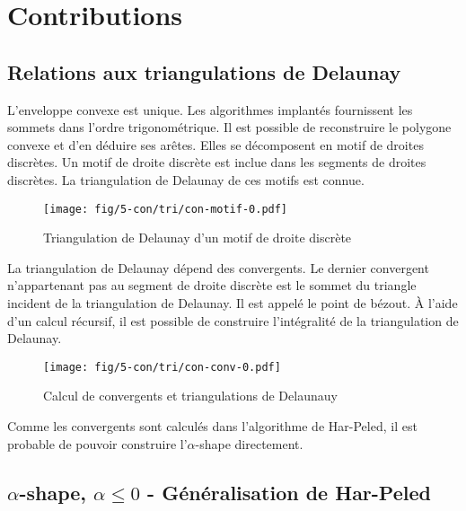 \section{Contributions}

\subsection{Relations aux triangulations de Delaunay}


L'enveloppe convexe est unique. Les algorithmes implantés fournissent les sommets dans l'ordre trigonométrique. Il est possible de reconstruire le polygone convexe et d'en déduire ses arêtes. Elles se décomposent en motif de droites discrètes. Un motif de droite discrète est inclue dans les segments de droites discrètes. La triangulation de Delaunay de ces motifs est connue. \cite{RoussillonL11}\\

\begin{figure}[H]
  \centering
  \texttt{[image: fig/5-con/tri/con-motif-0.pdf]}
  \caption{Triangulation de Delaunay d'un motif de droite discrète}
\end{figure}

La triangulation de Delaunay dépend des convergents. Le dernier convergent n'appartenant pas au segment de droite discrète est le sommet du triangle incident de la triangulation de Delaunay. Il est appelé le point de bézout. À l'aide d'un calcul récursif, il est possible de construire l'intégralité de la triangulation de Delaunay.

\begin{figure}[H]
  \centering
  \texttt{[image: fig/5-con/tri/con-conv-0.pdf]}
  \caption{Calcul de convergents et triangulations de Delaunauy}
\end{figure}

Comme les convergents sont calculés dans l’algorithme de Har-Peled, il est probable de pouvoir construire l'$\alpha$-shape directement. 

\subsection{$\alpha$-shape, $\alpha \leq 0$ - Généralisation de Har-Peled}

